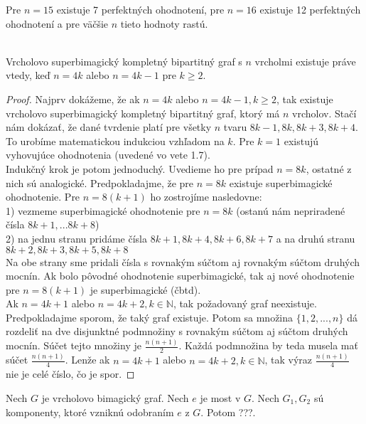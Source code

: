 Pre $n = 15$ existuje 7 perfektných ohodnotení, pre $n = 16$ existuje 12 perfektných ohodnotení a pre väčšie $n$ tieto hodnoty rastú. \\\\

\begin{subtheorem} Vrcholovo superbimagický kompletný bipartitný graf s $n$ vrcholmi existuje práve vtedy, keď $n = 4k$ alebo $n = 4k-1$ pre $k \geq 2$.
\end{subtheorem}

\begin{proof} Najprv dokážeme, že ak $n = 4k$ alebo $n = 4k-1, k \geq 2$, tak existuje vrcholovo superbimagický kompletný bipartitný graf, ktorý má $n$ vrcholov. Stačí nám dokázať, že dané tvrdenie platí pre všetky $n$ tvaru $8k-1, 8k, 8k+3, 8k+4$. To urobíme matematickou indukciou vzhľadom na $k$. Pre $k = 1$ existujú vyhovujúce ohodnotenia (uvedené vo vete 1.7). \\

Indukčný krok je potom jednoduchý. Uvedieme ho pre prípad $n = 8k$, ostatné z nich sú analogické. Predpokladajme, že pre $n = 8k$ existuje superbimagické ohodnotenie. Pre $n = 8(k+1)$ ho zostrojíme nasledovne: \\
1) vezmeme superbimagické ohodnotenie pre $n = 8k$ (ostanú nám nepriradené čísla $8k+1, ... 8k+8$) \\
2) na jednu stranu pridáme čísla $8k+1, 8k+4, 8k+6, 8k+7$ a na druhú stranu $8k+2, 8k+3, 8k+5, 8k+8$ \\
Na obe strany sme pridali čísla s rovnakým súčtom aj rovnakým súčtom druhých mocnín. Ak bolo pôvodné ohodnotenie superbimagické, tak aj nové ohodnotenie pre $n = 8(k+1)$ je superbimagické (čbtd). \\

Ak $n = 4k+1$ alebo $n = 4k+2, k \in \mathbb{N}$, tak požadovaný graf neexistuje. Predpokladajme sporom, že taký graf existuje. Potom sa množina $\{1, 2, ... , n\}$ dá rozdeliť na dve disjunktné podmnožiny s rovnakým súčtom aj súčtom druhých mocnín. Súčet tejto množiny je $\frac{n(n+1)}{2}$. Každá podmnožina by teda musela mať súčet $\frac{n(n+1)}{4}$. Lenže ak  $n = 4k+1$ alebo $n = 4k+2, k \in \mathbb{N}$, tak výraz $\frac{n(n+1)}{4}$ nie je celé číslo, čo je spor.
\end{proof}

\begin{subtheorem} Nech $G$ je vrcholovo bimagický graf. Nech $e$ je most v $G$. Nech $G_1, G_2$ sú komponenty, ktoré vzniknú odobraním $e$ z $G$. Potom ???.
\end{subtheorem}

